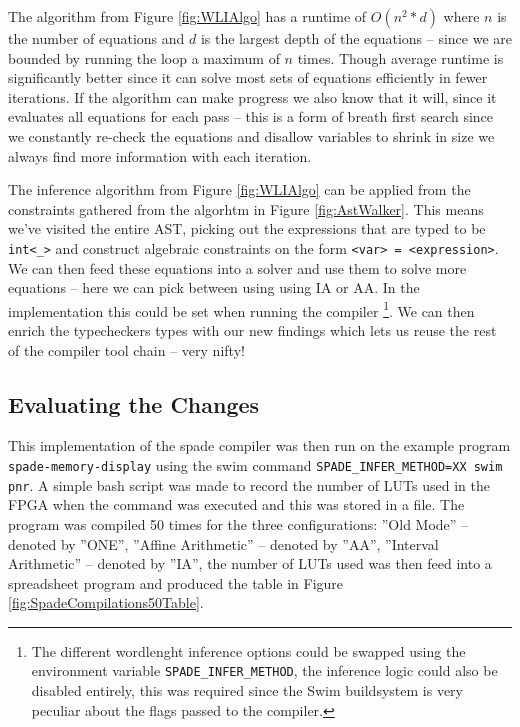 The algorithm from Figure \ref{fig:WLIAlgo} has a runtime of $O(n^2*d)$ where $n$ is the number of equations and $d$ is the largest depth of the equations -- since we are bounded by running the loop a maximum of $n$ times. Though average runtime is significantly better since it can solve most sets of equations efficiently in fewer iterations. If the algorithm can make progress we also know that it will, since it evaluates all equations for each pass -- this is a form of breath first search since we constantly re-check the equations and disallow variables to shrink in size we always find more information with each iteration.

The inference algorithm from Figure \ref{fig:WLIAlgo} can be applied from the constraints gathered from the algorhtm in Figure \ref{fig:AstWalker}. This means we've visited the entire AST, picking out the expressions that are typed to be \verb+int<_>+ and construct algebraic constraints on the form \verb+<var> = <expression>+. We can then feed these equations into a solver and use them to solve more equations -- here we can pick between using using IA or AA. In the implementation this could be set when running the compiler \cprotect\footnote{The different wordlenght inference options could be swapped using the environment variable \verb+SPADE_INFER_METHOD+, the inference logic could also be disabled entirely, this was required since the Swim buildsystem is very peculiar about the flags passed to the compiler.}. We can then enrich the typecheckers types with our new findings which lets us reuse the rest of the compiler tool chain -- very nifty!

\subsection{Evaluating the Changes}
This implementation of the spade compiler was then run on the example program \verb+spade-memory-display+ using the swim command \verb+SPADE_INFER_METHOD=XX swim pnr+. A simple bash script was made to record the number of LUTs used in the FPGA when the command was executed and this was stored in a file. The program was compiled 50 times for the three configurations: ''Old Mode'' -- denoted by ''ONE'', ''Affine Arithmetic'' -- denoted by ''AA'', ''Interval Arithmetic'' -- denoted by ''IA'', the number of LUTs used was then feed into a spreadsheet program and produced the table in Figure \ref{fig:SpadeCompilations50Table}.

